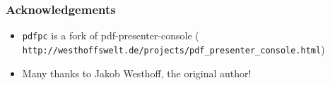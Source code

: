 \documentclass{beamer}
\newcommand{\pdfpc}{\texttt{pdfpc}\xspace}
\begin{document}
\begin{frame}[fragile]
  \frametitle{Acknowledgements}
  \begin{itemize}
    \item \pdfpc is a fork of pdf-presenter-console
      ({\footnotesize
        \verb+http://westhoffswelt.de/projects/pdf_presenter_console.html+})
    \item Many thanks to Jakob Westhoff, the original author!
  \end{itemize}
\end{frame}
\end{document}
